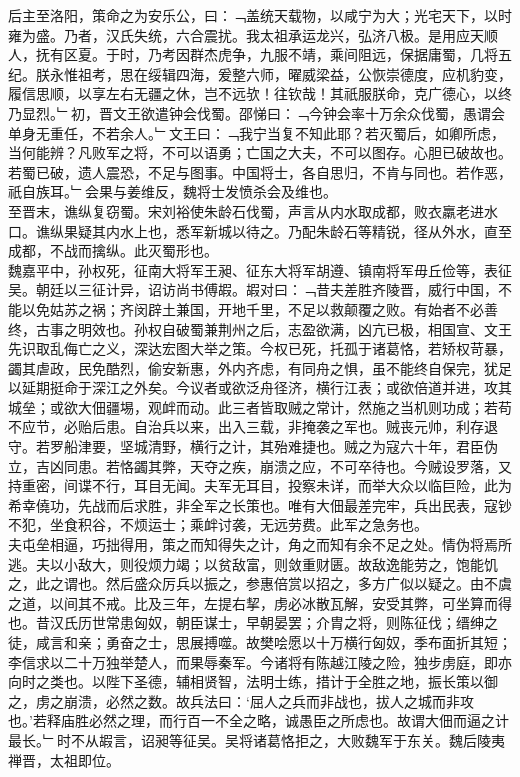 {{后主至洛阳，策命之为安乐公，曰：﹁盖统天载物，以咸宁为大；光宅天下，以时雍为盛。乃者，汉氏失统，六合震扰。我太祖承运龙兴，弘济八极。是用应天顺人，抚有区夏。于时，乃考因群杰虎争，九服不靖，乘间阻远，保据庸蜀，几将五纪。朕永惟祖考，思在绥辑四海，爰整六师，曜威梁益，公恢崇德度，应机豹变，履信思顺，以享左右无疆之休，岂不远欤！往钦哉！其祇服朕命，克广德心，以终乃显烈。﹂初，晋文王欲遣钟会伐蜀。邵悌曰：﹁今钟会率十万余众伐蜀，愚谓会单身无重任，不若余人。﹂文王曰：﹁我宁当复不知此耶？若灭蜀后，如卿所虑，当何能辨？凡败军之将，不可以语勇；亡国之大夫，不可以图存。心胆已破故也。若蜀已破，遗人震恐，不足与图事。中国将士，各自思归，不肯与同也。若作恶，祇自族耳。﹂会果与姜维反，魏将士发愤杀会及维也。}\\
至晋末，谯纵复窃蜀。宋刘裕使朱龄石伐蜀，声言从内水取成都，败衣羸老进水口。谯纵果疑其内水上也，悉军新城以待之。乃配朱龄石等精锐，径从外水，直至成都，不战而擒纵。此灭蜀形也。\\
魏嘉平中，孙权死，征南大将军王昶、征东大将军胡遵、镇南将军毋丘俭等，表征吴。朝廷以三征计异，诏访尚书傅嘏。嘏对曰：﹁昔夫差胜齐陵晋，威行中国，不能以免姑苏之祸；齐闵辟土兼国，开地千里，不足以救颠覆之败。有始者不必善终，古事之明效也。孙权自破蜀兼荆州之后，志盈欲满，凶亢已极，相国宣、文王先识取乱侮亡之义，深达宏图大举之策。今权已死，托孤于诸葛恪，若矫权苛暴，蠲其虐政，民免酷烈，偷安新惠，外内齐虑，有同舟之惧，虽不能终自保完，犹足以延期挺命于深江之外矣。今议者或欲泛舟径济，横行江表；或欲倍道并进，攻其城垒；或欲大佃疆埸，观衅而动。此三者皆取贼之常计，然施之当机则功成；若苟不应节，必贻后患。自治兵以来，出入三载，非掩袭之军也。贼丧元帅，利存退守。若罗船津要，坚城清野，横行之计，其殆难捷也。贼之为寇六十年，君臣伪立，吉凶同患。若恪蠲其弊，天夺之疾，崩溃之应，不可卒待也。今贼设罗落，又持重密，间谍不行，耳目无闻。夫军无耳目，投察未详，而举大众以临巨险，此为希幸僥功，先战而后求胜，非全军之长策也。唯有大佃最差完牢，兵出民表，寇钞不犯，坐食积谷，不烦运士；乘衅讨袭，无远劳费。此军之急务也。\\
夫屯垒相逼，巧拙得用，策之而知得失之计，角之而知有余不足之处。情伪将焉所逃。夫以小敌大，则役烦力竭；以贫敌富，则敛重财匮。故敌逸能劳之，饱能饥之，此之谓也。然后盛众厉兵以振之，参惠倍赏以招之，多方广似以疑之。由不虞之道，以间其不戒。比及三年，左提右挈，虏必冰散瓦解，安受其弊，可坐算而得也。昔汉氏历世常患匈奴，朝臣谋士，早朝晏罢；介胄之将，则陈征伐；缙绅之徒，咸言和亲；勇奋之士，思展搏噬。故樊哙愿以十万横行匈奴，季布面折其短；李信求以二十万独举楚人，而果辱秦军。今诸将有陈越江陵之险，独步虏庭，即亦向时之类也。以陛下圣德，辅相贤智，法明士练，措计于全胜之地，振长策以御之，虏之崩溃，必然之数。故兵法曰：‘屈人之兵而非战也，拔人之城而非攻也。’若释庙胜必然之理，而行百一不全之略，诚愚臣之所虑也。故谓大佃而逼之计最长。﹂时不从嘏言，诏昶等征吴。吴将诸葛恪拒之，大败魏军于东关。魏后陵夷禅晋，太祖即位。
}
